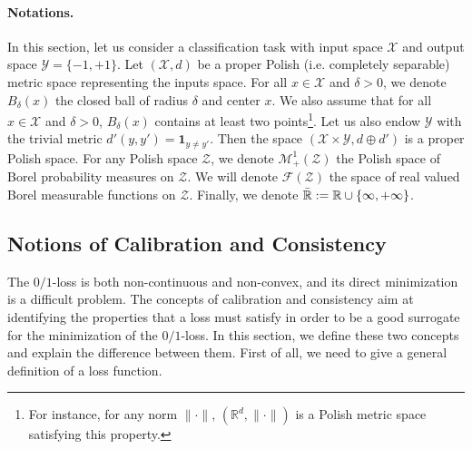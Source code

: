
\paragraph{Notations.} In this section, let us consider a classification task with input space $\mathcal{X}$ and output space $\mathcal{Y}=\{-1,+1\}$. Let $(\mathcal{X},d)$ be a proper Polish (i.e. completely separable) metric space representing the inputs space. For all $x\in\mathcal{X}$ and $\delta>0$, we denote $B_\delta(x)$ the closed ball of radius $\delta$ and center $x$. We also assume that for all $x\in\mathcal{X}$ and $\delta>0$,  $B_\delta(x)$ contains at least two points\footnote{For instance, for any norm $\lVert\cdot\rVert$,  $(\mathbb{R}^d,\lVert \cdot \rVert)$ is a Polish metric space satisfying this property.}. Let us also endow $\mathcal{Y}$ with the trivial metric  $d'(y,y') = \mathbf{1}_{y\neq y'}$. Then the space $(\mathcal{X}\times\mathcal{Y},d\oplus d')$ is a proper Polish space. For any Polish space $\mathcal{Z}$, we denote $\mathcal{M}_+^1(\mathcal{Z})$ the Polish space of Borel probability measures on $\mathcal{Z}$. We will denote $\mathcal{F}(\mathcal{Z})$ the space of real valued Borel measurable functions on $\mathcal{Z}$. Finally, we denote $\bar{\mathbb{R}}:=\mathbb{R}\cup\{\-\infty,+\infty\}$.


\subsection{Notions of Calibration and Consistency}

The $0/1$-loss is both non-continuous and non-convex, and its direct minimization is a difficult problem. The concepts of calibration and consistency aim at identifying the properties that a loss must satisfy in order to be a good surrogate for the minimization of the $0/1$-loss. In this section, we define these two concepts and explain the difference between them. First of all, we need to give a general definition of a loss function.

